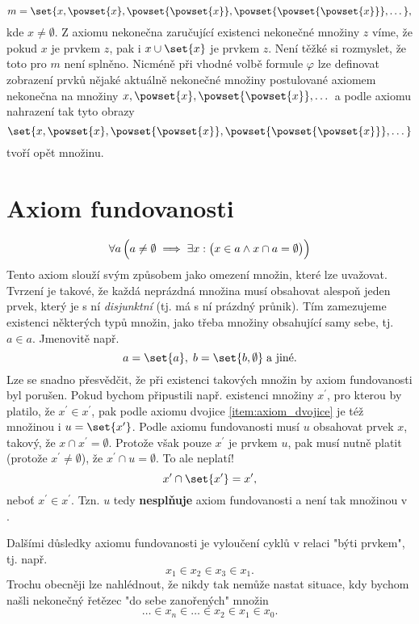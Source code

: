 \begin{equation*}
    m=\set{x,\powset{x},\powset{\powset{x}},\powset{\powset{\powset{x}}},\dots},
\end{equation*}
kde $x\neq\emptyset$. Z axiomu nekonečna zaručující existenci nekonečné množiny $z$ víme, že pokud $x$ je prvkem $z$, pak i $x\cup\set{x}$ je prvkem $z$. Není těžké si rozmyslet, že toto pro $m$ není splněno. Nicméně při vhodné volbě formule $\varphi$ lze definovat zobrazení prvků nějaké aktuálně nekonečné množiny postulované axiomem nekonečna na množiny $x,\powset{x},\powset{\powset{x}},\dots$ a podle axiomu nahrazení tak tyto obrazy
\begin{equation*}
    \set{x,\powset{x},\powset{\powset{x}},\powset{\powset{\powset{x}}},\dots}
\end{equation*}
tvoří opět množinu.

\section{Axiom fundovanosti}\label{sec:axiom_fundovanosti}
\begin{equation*}
    \forall a\,\Bigl(a\neq\emptyset \implies \exists x:\bigl(x\in a \land x\cap a=\emptyset\bigr)\Bigr)
\end{equation*}
Tento axiom slouží svým způsobem jako omezení množin, které lze uvažovat. Tvrzení je takové, že každá neprázdná množina musí obsahovat alespoň jeden prvek, který je s ní \emph{disjunktní} (tj. má s ní prázdný průnik). Tím zamezujeme existenci některých typů množin, jako třeba množiny obsahující samy sebe, tj. $a\in a$. Jmenovitě např.
\begin{equation*}
    a=\set{a},\;b=\set{b,\emptyset}\;\text{a jiné.}
\end{equation*}
Lze se snadno přesvědčit, že při existenci takových množin by axiom fundovanosti byl porušen. Pokud bychom připustili např. existenci množiny $x^\prime$, pro kterou by platilo, že $x^\prime\in x^\prime$, pak podle axiomu dvojice \ref{item:axiom_dvojice} je též množinou i $u=\set{x^\prime}$. Podle axiomu fundovanosti musí $u$ obsahovat prvek $x$, takový, že $x\cap x^\prime=\emptyset$. Protože však pouze $x^\prime$ je prvkem $u$, pak musí nutně platit (protože $x^\prime\neq\emptyset$), že $x^\prime\cap u=\emptyset$. To ale neplatí!
\begin{equation*}
    x^\prime\cap\set{x^\prime}=x^\prime,
\end{equation*}
neboť $x^\prime\in x^\prime$. Tzn. $u$ tedy \textbf{nesplňuje} axiom fundovanosti a není tak množinou v \ZF.\par
Dalšími důsledky axiomu fundovanosti je vyloučení cyklů v relaci "býti prvkem", tj. např.
\begin{equation*}
    x_1\in x_2\in x_3\in x_1.
\end{equation*}
Trochu obecněji lze nahlédnout, že nikdy tak nemůže nastat situace, kdy bychom našli nekonečný řetězec "do sebe zanořených" množin
\begin{equation*}
    \dots \in x_n\in \dots\in x_2\in x_1\in x_0.
\end{equation*}
\medskip

